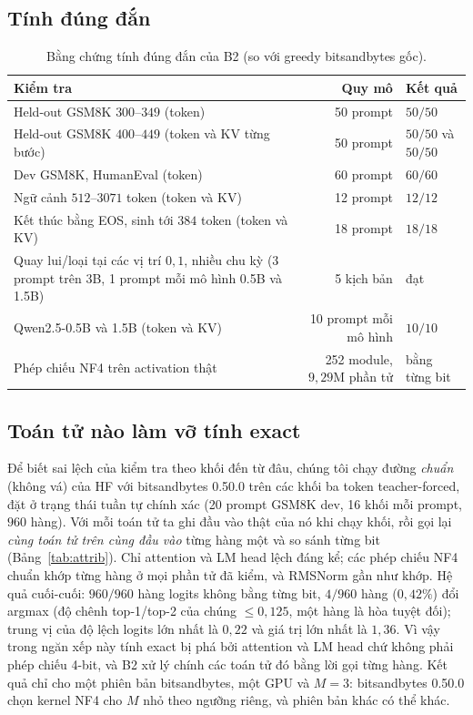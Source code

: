 \documentclass[a4paper,11pt]{article}
\begin{document}
\subsection{Tính đúng đắn}
\begin{table}[t]
\centering\small
\caption{Bằng chứng tính đúng đắn của B2 (so với greedy bitsandbytes gốc).}\label{tab:exact}
\begin{tabularx}{\textwidth}{@{}Xrl@{}}
\toprule
Kiểm tra & Quy mô & Kết quả\\\midrule
Held-out GSM8K $300$--$349$ (token) & 50 prompt & $50/50$\\
Held-out GSM8K $400$--$449$ (token và KV từng bước) & 50 prompt & $50/50$ và $50/50$\\
Dev GSM8K, HumanEval (token) & 60 prompt & $60/60$\\
Ngữ cảnh $512$--$3071$ token (token và KV) & 12 prompt & $12/12$\\
Kết thúc bằng EOS, sinh tới $384$ token (token và KV) & 18 prompt & $18/18$\\
Quay lui/loại tại các vị trí $0,1$, nhiều chu kỳ (3 prompt trên 3B, 1 prompt mỗi mô hình 0.5B và 1.5B) & 5 kịch bản & đạt\\
Qwen2.5-0.5B và 1.5B (token và KV) & 10 prompt mỗi mô hình & $10/10$\\
Phép chiếu NF4 trên activation thật & 252 module, $9{,}29$M phần tử & bằng từng bit\\
\bottomrule
\end{tabularx}
\end{table}

\subsection{Toán tử nào làm vỡ tính exact}\label{sec:attrib}
Để biết sai lệch của kiểm tra theo khối đến từ đâu, chúng tôi chạy đường \emph{chuẩn} (không vá) của HF với bitsandbytes 0.50.0 trên các khối ba token teacher-forced, đặt ở trạng thái tuần tự chính xác (20 prompt GSM8K dev, 16 khối mỗi prompt, $960$ hàng). Với mỗi toán tử ta ghi đầu vào thật của nó khi chạy khối, rồi gọi lại \emph{cùng toán tử trên cùng đầu vào} từng hàng một và so sánh từng bit (Bảng~\ref{tab:attrib}). Chỉ attention và LM head lệch đáng kể; các phép chiếu NF4 chuẩn khớp từng hàng ở mọi phần tử đã kiểm, và RMSNorm gần như khớp. Hệ quả cuối-cuối: $960/960$ hàng logits không bằng từng bit, $4/960$ hàng ($0{,}42\%$) đổi argmax (độ chênh top-1/top-2 của chúng $\le 0{,}125$, một hàng là hòa tuyệt đối); trung vị của độ lệch logits lớn nhất là $0{,}22$ và giá trị lớn nhất là $1{,}36$. Vì vậy trong ngăn xếp này tính exact bị phá bởi attention và LM head chứ không phải phép chiếu 4-bit, và B2 xử lý chính các toán tử đó bằng lời gọi từng hàng. Kết quả chỉ cho một phiên bản bitsandbytes, một GPU và $M{=}3$: bitsandbytes 0.50.0 chọn kernel NF4 cho $M$ nhỏ theo ngưỡng riêng, và phiên bản khác có thể khác.
\end{document}
